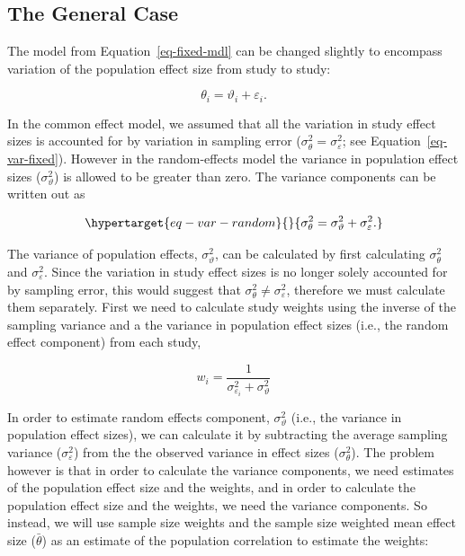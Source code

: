 \documentclass[
  letterpaper,
  DIV=11,
  numbers=noendperiod]{scrreprt}
\begin{document}
\hypertarget{the-general-case-1}{%
\subsection{The General Case}\label{the-general-case-1}}

The model from Equation~\ref{eq-fixed-mdl} can be changed slightly to
encompass variation of the population effect size from study to study:

\[
\theta_i = \vartheta_i + \varepsilon_i.
\]

In the common effect model, we assumed that all the variation in study
effect sizes is accounted for by variation in sampling error
(\(\sigma^2_\theta = \sigma^2_\varepsilon\); see
Equation~\ref{eq-var-fixed}). However in the random-effects model the
variance in population effect sizes (\(\sigma^2_\vartheta\)) is allowed
to be greater than zero. The variance components can be written out as

\begin{equation}\protect\hypertarget{eq-var-random}{}{
\sigma^2_\theta=\sigma^2_\vartheta + \sigma^2_\varepsilon.
}\label{eq-var-random}\end{equation}

The variance of population effects, \(\sigma^2_\vartheta\), can be
calculated by first calculating \(\sigma^2_\theta\) and
\(\sigma^2_\varepsilon\). Since the variation in study effect sizes is
no longer solely accounted for by sampling error, this would suggest
that \(\sigma^2_\theta \neq \sigma^2_\varepsilon\), therefore we must
calculate them separately. First we need to calculate study weights
using the inverse of the sampling variance and a the variance in
population effect sizes (i.e., the random effect component) from each
study,

\[
w_i = \frac{1}{\sigma^2_{\varepsilon_i}+\sigma_\vartheta^2}
\]

In order to estimate random effects component, \(\sigma_\vartheta^2\)
(i.e., the variance in population effect sizes), we can calculate it by
subtracting the average sampling variance (\(\sigma^2_\varepsilon\))
from the the observed variance in effect sizes (\(\sigma^2_\theta\)).
The problem however is that in order to calculate the variance
components, we need estimates of the population effect size and the
weights, and in order to calculate the population effect size and the
weights, we need the variance components. So instead, we will use sample
size weights and the sample size weighted mean effect size
(\(\bar{\theta}\)) as an estimate of the population correlation to
estimate the weights:
\end{document}
